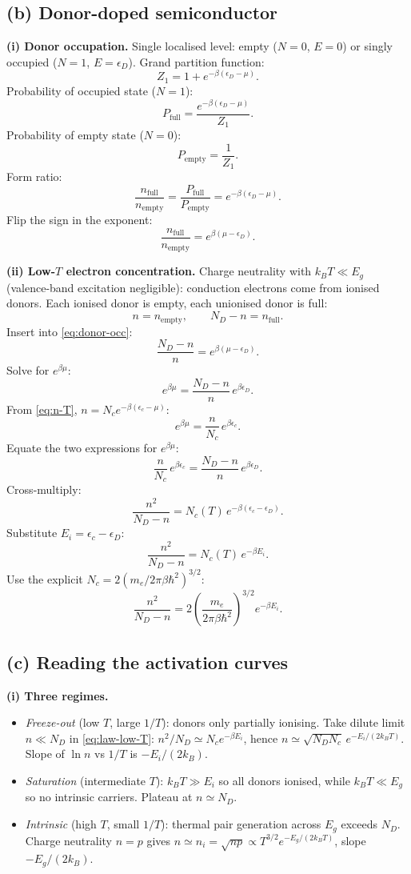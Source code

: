 \documentclass[11pt]{article}
\begin{document}
\subsection*{(b) Donor-doped semiconductor}

\textbf{(i) Donor occupation.} Single localised level: empty ($N=0$, $E=0$) or singly occupied ($N=1$, $E=\epsilon_D$). Grand partition function:
\[ Z_1=1+e^{-\beta(\epsilon_D-\mu)}. \]
Probability of occupied state ($N=1$):
\[ P_{\text{full}}=\frac{e^{-\beta(\epsilon_D-\mu)}}{Z_1}. \]
Probability of empty state ($N=0$):
\[ P_{\text{empty}}=\frac{1}{Z_1}. \]
Form ratio:
\[ \frac{n_{\text{full}}}{n_{\text{empty}}}=\frac{P_{\text{full}}}{P_{\text{empty}}}=e^{-\beta(\epsilon_D-\mu)}. \]
Flip the sign in the exponent:
\begin{equation}
\boxed{\;\frac{n_{\text{full}}}{n_{\text{empty}}}=e^{\beta(\mu-\epsilon_D)}.\;}
\label{eq:donor-occ}
\end{equation}

\textbf{(ii) Low-$T$ electron concentration.} Charge neutrality with $k_B T\ll E_g$ (valence-band excitation negligible): conduction electrons come from ionised donors. Each ionised donor is empty, each unionised donor is full:
\[ n=n_{\text{empty}},\qquad N_D-n=n_{\text{full}}. \]
Insert into \eqref{eq:donor-occ}:
\[ \frac{N_D-n}{n}=e^{\beta(\mu-\epsilon_D)}. \]
Solve for $e^{\beta\mu}$:
\[ e^{\beta\mu}=\frac{N_D-n}{n}\,e^{\beta\epsilon_D}. \]
From \eqref{eq:n-T}, $n=N_c e^{-\beta(\epsilon_c-\mu)}$:
\[ e^{\beta\mu}=\frac{n}{N_c}\,e^{\beta\epsilon_c}. \]
Equate the two expressions for $e^{\beta\mu}$:
\[ \frac{n}{N_c}\,e^{\beta\epsilon_c}=\frac{N_D-n}{n}\,e^{\beta\epsilon_D}. \]
Cross-multiply:
\[ \frac{n^2}{N_D-n}=N_c(T)\,e^{-\beta(\epsilon_c-\epsilon_D)}. \]
Substitute $E_i=\epsilon_c-\epsilon_D$:
\[ \frac{n^2}{N_D-n}=N_c(T)\,e^{-\beta E_i}. \]
Use the explicit $N_c=2(m_e/2\pi\beta\hbar^2)^{3/2}$:
\begin{equation}
\boxed{\;\frac{n^2}{N_D-n}=2\!\left(\frac{m_e}{2\pi\beta\hbar^2}\right)^{\!3/2}\!e^{-\beta E_i}.\;}
\label{eq:law-low-T}
\end{equation}

\subsection*{(c) Reading the activation curves}

\textbf{(i) Three regimes.}
\begin{itemize}
\item \emph{Freeze-out} (low $T$, large $1/T$): donors only partially ionising. Take dilute limit $n\ll N_D$ in \eqref{eq:law-low-T}: $n^2/N_D\simeq N_c e^{-\beta E_i}$, hence $n\simeq\sqrt{N_D N_c}\,e^{-E_i/(2k_B T)}$. Slope of $\ln n$ vs $1/T$ is $-E_i/(2k_B)$.
\item \emph{Saturation} (intermediate $T$): $k_BT\gg E_i$ so all donors ionised, while $k_BT\ll E_g$ so no intrinsic carriers. Plateau at $n\simeq N_D$.
\item \emph{Intrinsic} (high $T$, small $1/T$): thermal pair generation across $E_g$ exceeds $N_D$. Charge neutrality $n=p$ gives $n\simeq n_i=\sqrt{np}\propto T^{3/2}e^{-E_g/(2k_B T)}$, slope $-E_g/(2k_B)$.
\end{itemize}
\end{document}
